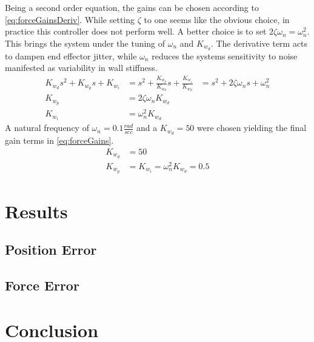 \documentclass[letterpaper,12pt]{report}
\begin{document}
Being a second order equation, the gains can be chosen according to \eqref{eq:forceGainsDeriv}. While setting $\zeta$ to one seems like the obvious
choice, in practice this controller does not perform well. A better choice is to set $2\zeta\omega_n = \omega_n^2$. This brings the system under
the tuning of $\omega_n$ and $K_{w_d}$. The derivative term acts to dampen end effector jitter, while $\omega_n$ reduces the systems sensitivity to 
noise manifested as variability in wall stiffness.
\begin{subequations} \label{eq:forceGainsDeriv}
\begin{align}
	K_{w_d}s^2 + K_{w_p}s + K_{w_i} &= s^2 + \frac {K_{w_p}}{K_{w_d}} s + \frac {K_{w_i}}{K_{w_d}}
	&= s^2 + 2\zeta\omega_ns + \omega_n^2\\
	K_{w_p} &= 2\zeta\omega_nK_{w_d}\\
	K_{w_i} &= \omega_n^2K_{w_d}
\end{align}
\end{subequations}
A natural frequency of $\omega_n = 0.1 \frac{rad}{sec}$ and a $K_{w_d} = 50$ were chosen yielding the final gain terms in \eqref{eq:forceGains}.
\begin{subequations} \label{eq:forceGains}
\begin{align}
	K_{w_d} &= 50\\
	K_{w_p} &= K_{w_i} = \omega_n^2K_{w_d} = 0.5
\end{align}
\end{subequations}
\chapter{Results}
\section{Position Error}
\section{Force Error}


\chapter{Conclusion}
\end{document}
